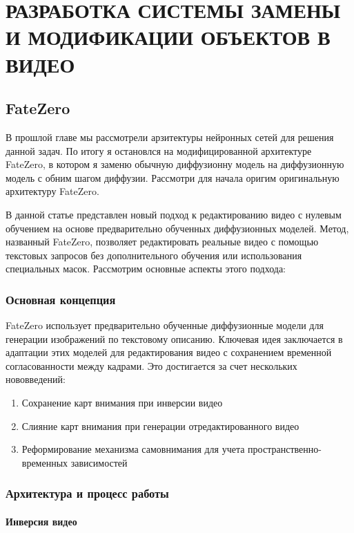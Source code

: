 \newpage

\section{РАЗРАБОТКА СИСТЕМЫ ЗАМЕНЫ И МОДИФИКАЦИИ ОБЪЕКТОВ В ВИДЕО}
\subsection{FateZero \texorpdfstring{\cite{fatezero}}{FateZero}}

В прошлой главе мы рассмотрели арзитектуры нейронных сетей для решения данной задач. По итогу я остановлся на модифицированной архитектуре FateZero, в котором я заменю обычную диффузионну модель на диффузионную модель с обним шагом диффузии. Рассмотри для начала оригим оригинальную архитектуру FateZero.

В данной статье представлен новый подход к редактированию видео с нулевым обучением на основе предварительно обученных диффузионных моделей. Метод, названный FateZero, позволяет редактировать реальные видео с помощью текстовых запросов без дополнительного обучения или использования специальных масок. Рассмотрим основные аспекты этого подхода:

\subsubsection{Основная концепция}

FateZero использует предварительно обученные диффузионные модели для генерации изображений по текстовому описанию. Ключевая идея заключается в адаптации этих моделей для редактирования видео с сохранением временной согласованности между кадрами. Это достигается за счет нескольких нововведений:

\begin{enumerate}
    \item Сохранение карт внимания при инверсии видео
    \item Слияние карт внимания при генерации отредактированного видео
    \item Реформирование механизма самовнимания для учета пространственно-временных зависимостей
\end{enumerate}


\subsubsection{Архитектура и процесс работы}

\paragraph{Инверсия видео}


